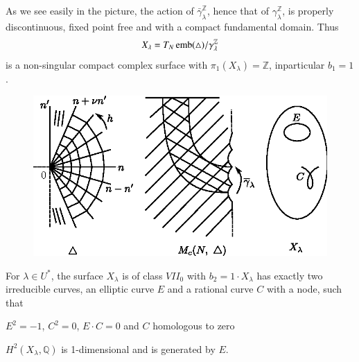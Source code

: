 As we see easily in the picture, the action of
$\bar{\gamma}^{\mathbb{Z}}_{\lambda}$, hence that of
$\gamma^{\mathbb{Z}}_{\lambda}$, is properly discontinuous, fixed
point free and with a compact fundamental domain. Thus  
$$
X_{\lambda} = T_{N} \operatorname{emb} (\triangle) / \gamma^{\mathbb{Z}}_{\lambda} 
$$
is a non-singular compact complex surface with $\pi_{1} (X_{\lambda}) 
= \mathbb{Z}$, in\pageoriginale particular $b_{1} = 1$. 
 \begin{figure}[H]
\centering 
\includegraphics{vol58-fig/fig58-72.eps} 
\end{figure}

\begin{theorem}\label{chap2:thm14.1}
 For $\lambda  \in U^{*}$, the surface $X_{\lambda}$ is
  of class $VII_{0}$ with $b_{2} = 1 \cdot X_{\lambda}$ has exactly two
  irreducible curves, an elliptic curve $E$ and a rational curve $C$
  with a node, such that   

$E^{2} = -1$,  $C^{2} = 0$, $E \cdot C = 0$ and $C$ homologous to zero

$H^{2} (X_{\lambda}, \mathbb{Q})$ is 1-dimensional and is generated by
  $E$. 
\end{theorem}

